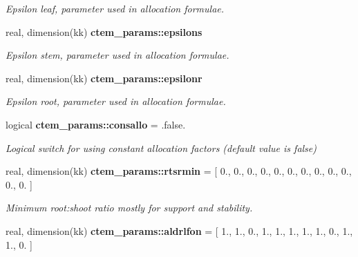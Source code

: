 \begin{DoxyCompactItemize}
\begin{DoxyCompactList}\small\item\em Epsilon leaf, parameter used in allocation formulae. \end{DoxyCompactList}\item 
\hypertarget{namespacectem__params_ae5c289e0db08b110ab093ab912b1955b}{}real, dimension(kk) {\bfseries ctem\+\_\+params\+::epsilons}\label{namespacectem__params_ae5c289e0db08b110ab093ab912b1955b}

\begin{DoxyCompactList}\small\item\em Epsilon stem, parameter used in allocation formulae. \end{DoxyCompactList}\item 
\hypertarget{namespacectem__params_aa0fc6a57a8dd09d0a6d57ccf9c2fdf5b}{}real, dimension(kk) {\bfseries ctem\+\_\+params\+::epsilonr}\label{namespacectem__params_aa0fc6a57a8dd09d0a6d57ccf9c2fdf5b}

\begin{DoxyCompactList}\small\item\em Epsilon root, parameter used in allocation formulae. \end{DoxyCompactList}\item 
\hypertarget{namespacectem__params_a7fc44574a63fd52e0b2556ba693de814}{}logical {\bfseries ctem\+\_\+params\+::consallo} = .false.\label{namespacectem__params_a7fc44574a63fd52e0b2556ba693de814}

\begin{DoxyCompactList}\small\item\em Logical switch for using constant allocation factors (default value is false) \end{DoxyCompactList}\item 
\hypertarget{namespacectem__params_ac542a7713cfae8ce6e7197c8d60c2081}{}real, dimension(kk) {\bfseries ctem\+\_\+params\+::rtsrmin} = \mbox{[} 0., 0., 0., 0., 0., 0., 0., 0., 0., 0., 0., 0. \mbox{]}\label{namespacectem__params_ac542a7713cfae8ce6e7197c8d60c2081}

\begin{DoxyCompactList}\small\item\em Minimum root\+:shoot ratio mostly for support and stability. \end{DoxyCompactList}\item 
\hypertarget{namespacectem__params_ab8a436206695f5f6c93d0579187ba037}{}real, dimension(kk) {\bfseries ctem\+\_\+params\+::aldrlfon} = \mbox{[} 1., 1., 0., 1., 1., 1., 1., 1., 0., 1., 1., 0. \mbox{]}\label{namespacectem__params_ab8a436206695f5f6c93d0579187ba037}


\end{DoxyCompactItemize}
